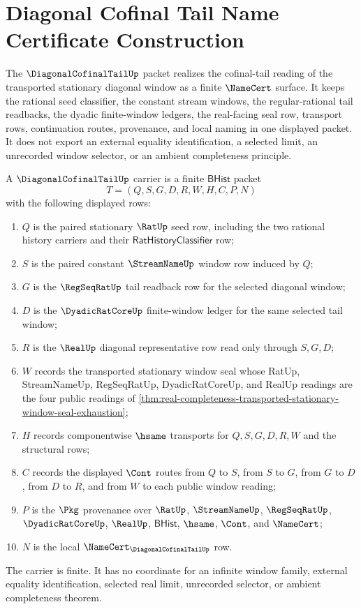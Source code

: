 \chapter{Diagonal Cofinal Tail Name Certificate Construction}
\label{ch:concrete-instances-diagonalcofinaltail-namecert}

The $\DiagonalCofinalTailUp$ packet realizes the cofinal-tail reading of the transported stationary diagonal window as a finite $\NameCert$ surface. It keeps the rational seed classifier, the constant stream windows, the regular-rational tail readbacks, the dyadic finite-window ledgers, the real-facing seal row, transport rows, continuation routes, provenance, and local naming in one displayed packet. It does not export an external equality identification, a selected limit, an unrecorded window selector, or an ambient completeness principle.

\begin{definition}
\label{def:diagonal-cofinal-tail-carrier}
A $\DiagonalCofinalTailUp$ carrier is a finite $\mathsf{BHist}$ packet
$$
T=(Q,S,G,D,R,W,H,C,P,N)
$$
with the following displayed rows:
\begin{enumerate}
\item $Q$ is the paired stationary $\RatUp$ seed row, including the two rational history carriers and their $\mathsf{RatHistoryClassifier}$ row;
\item $S$ is the paired constant $\StreamNameUp$ window row induced by $Q$;
\item $G$ is the $\RegSeqRatUp$ tail readback row for the selected diagonal window;
\item $D$ is the $\DyadicRatCoreUp$ finite-window ledger for the same selected tail window;
\item $R$ is the $\RealUp$ diagonal representative row read only through $S,G,D$;
\item $W$ records the transported stationary window seal whose RatUp, StreamNameUp, RegSeqRatUp, DyadicRatCoreUp, and RealUp readings are the four public readings of \autoref{thm:real-completeness-transported-stationary-window-seal-exhaustion};
\item $H$ records componentwise $\hsame$ transports for $Q,S,G,D,R,W$ and the structural rows;
\item $C$ records the displayed $\Cont$ routes from $Q$ to $S$, from $S$ to $G$, from $G$ to $D$, from $D$ to $R$, and from $W$ to each public window reading;
\item $P$ is the $\Pkg$ provenance over $\RatUp$, $\StreamNameUp$, $\RegSeqRatUp$, $\DyadicRatCoreUp$, $\RealUp$, $\mathsf{BHist}$, $\hsame$, $\Cont$, and $\NameCert$;
\item $N$ is the local $\NameCert_{\DiagonalCofinalTailUp}$ row.
\end{enumerate}
The carrier is finite. It has no coordinate for an infinite window family, external equality identification, selected real limit, unrecorded selector, or ambient completeness theorem.
\end{definition}

